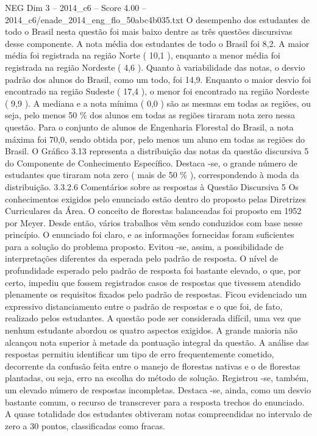 \begin{textsample}{NEG Dim 3 – 2014\_c6 – Score 4.00 – 2014\_c6/enade\_2014\_eng\_flo\_50abc4b035.txt}
O desempenho dos estudantes de todo o Brasil nesta questão foi mais baixo dentre as três questões discursivas desse componente.
A nota média dos estudantes de todo o Brasil foi 8,2.
A maior média foi registrada na região Norte ( 10,1 ), enquanto a menor média foi registrada na região Nordeste ( 4,6 ).
Quanto à variabilidade das notas, o desvio padrão dos alunos do Brasil, como um todo, foi 14,9.
Enquanto o maior desvio foi encontrado na região Sudeste ( 17,4 ), o menor foi encontrado na região Nordeste ( 9,9 ).
A mediana e a nota mínima ( 0,0 ) são as mesmas em todas as regiões, ou seja, pelo menos 50 \% dos alunos em todas as regiões tiraram nota zero nessa questão.
Para o conjunto de alunos de Engenharia Florestal do Brasil, a nota máxima foi 70,0, sendo obtida por, pelo menos um aluno em todas as regiões do Brasil.
O Gráfico 3.13 representa a distribuição das notas da questão discursiva 5 do Componente de Conhecimento Específico.
Destaca -se, o grande número de estudantes que tiraram nota zero ( mais de 50 \% ), correspondendo à moda da distribuição. 3.3.2.6 Comentários sobre as respostas à Questão Discursiva 5 Os conhecimentos exigidos pelo enunciado estão dentro do proposto pelas Diretrizes Curriculares da Área.
O conceito de florestas balanceadas foi proposto em 1952 por Meyer.
Desde então, vários trabalhos vêm sendo conduzidos com base nesse princípio.
O enunciado foi claro, e as informações fornecidas foram suficientes para a solução do problema proposto.
Evitou -se, assim, a possibilidade de interpretações diferentes da esperada pelo padrão de resposta.
O nível de profundidade esperado pelo padrão de resposta foi bastante elevado, o que, por certo, impediu que fossem registrados casos de respostas que tivessem atendido plenamente os requisitos fixados pelo padrão de respostas.
Ficou evidenciado um expressivo distanciamento entre o padrão de respostas e o que foi, de fato, realizado pelos estudantes.
A questão pode ser considerada difícil, uma vez que nenhum estudante abordou os quatro aspectos exigidos.
A grande maioria não alcançou nota superior à metade da pontuação integral da questão.
A análise das respostas permitiu identificar um tipo de erro frequentemente cometido, decorrente da confusão feita entre o manejo de florestas nativas e o de florestas plantadas, ou seja, erro na escolha do método de solução.
Registrou -se, também, um elevado número de respostas incompletas.
Destaca -se, ainda, como um desvio bastante comum, o recurso de transcrever para a resposta trechos do enunciado.
A quase totalidade dos estudantes obtiveram notas compreendidas no intervalo de zero a 30 pontos, classificadas como fracas.

\end{textsample}
